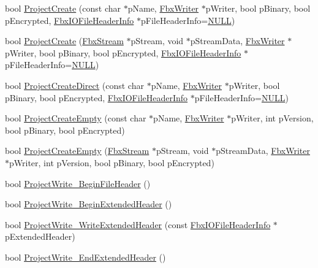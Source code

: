 \begin{Indent}
\begin{DoxyCompactItemize}
\item 
bool \hyperlink{class_fbx_i_o_a2f48c51f3c816fdd04c23a5d4d493d83}{Project\+Create} (const char $\ast$p\+Name, \hyperlink{class_fbx_writer}{Fbx\+Writer} $\ast$p\+Writer, bool p\+Binary, bool p\+Encrypted, \hyperlink{class_fbx_i_o_file_header_info}{Fbx\+I\+O\+File\+Header\+Info} $\ast$p\+File\+Header\+Info=\hyperlink{fbxarch_8h_a070d2ce7b6bb7e5c05602aa8c308d0c4}{N\+U\+LL})
\item 
bool \hyperlink{class_fbx_i_o_abb761c505874018d953834ff64e347be}{Project\+Create} (\hyperlink{class_fbx_stream}{Fbx\+Stream} $\ast$p\+Stream, void $\ast$p\+Stream\+Data, \hyperlink{class_fbx_writer}{Fbx\+Writer} $\ast$p\+Writer, bool p\+Binary, bool p\+Encrypted, \hyperlink{class_fbx_i_o_file_header_info}{Fbx\+I\+O\+File\+Header\+Info} $\ast$p\+File\+Header\+Info=\hyperlink{fbxarch_8h_a070d2ce7b6bb7e5c05602aa8c308d0c4}{N\+U\+LL})
\item 
bool \hyperlink{class_fbx_i_o_a24c877dbeb0e78dd308c97fc99a656a9}{Project\+Create\+Direct} (const char $\ast$p\+Name, \hyperlink{class_fbx_writer}{Fbx\+Writer} $\ast$p\+Writer, bool p\+Binary, bool p\+Encrypted, \hyperlink{class_fbx_i_o_file_header_info}{Fbx\+I\+O\+File\+Header\+Info} $\ast$p\+File\+Header\+Info=\hyperlink{fbxarch_8h_a070d2ce7b6bb7e5c05602aa8c308d0c4}{N\+U\+LL})
\item 
bool \hyperlink{class_fbx_i_o_aba4ca683f0cb84980bfbdb3e867ddd0a}{Project\+Create\+Empty} (const char $\ast$p\+Name, \hyperlink{class_fbx_writer}{Fbx\+Writer} $\ast$p\+Writer, int p\+Version, bool p\+Binary, bool p\+Encrypted)
\item 
bool \hyperlink{class_fbx_i_o_ad371dfba1cd99e9329e19fbd78be2fc2}{Project\+Create\+Empty} (\hyperlink{class_fbx_stream}{Fbx\+Stream} $\ast$p\+Stream, void $\ast$p\+Stream\+Data, \hyperlink{class_fbx_writer}{Fbx\+Writer} $\ast$p\+Writer, int p\+Version, bool p\+Binary, bool p\+Encrypted)
\item 
bool \hyperlink{class_fbx_i_o_a95f114d4f159ca04056e8ab64f8f5ebe}{Project\+Write\+\_\+\+Begin\+File\+Header} ()
\item 
bool \hyperlink{class_fbx_i_o_a6efe694fd5980f3990d6146f830106a3}{Project\+Write\+\_\+\+Begin\+Extended\+Header} ()
\item 
bool \hyperlink{class_fbx_i_o_a0a8834ee86d5f7709aaf85e835b0dc50}{Project\+Write\+\_\+\+Write\+Extended\+Header} (const \hyperlink{class_fbx_i_o_file_header_info}{Fbx\+I\+O\+File\+Header\+Info} $\ast$p\+Extended\+Header)
\item 
bool \hyperlink{class_fbx_i_o_a3ed18bfe65eb481801bd9e7a8f86b0c1}{Project\+Write\+\_\+\+End\+Extended\+Header} ()

\end{DoxyCompactItemize}
\end{Indent}

